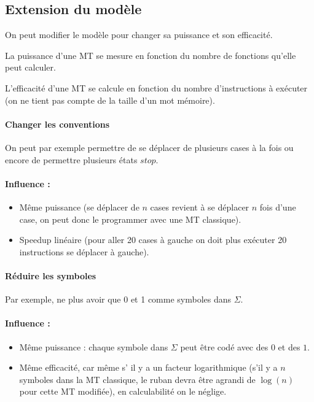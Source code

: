 \subsection{Extension du modèle}
On peut modifier le modèle pour changer sa puissance et son efficacité.

\begin{mydef} La puissance d'une MT se mesure en
	fonction du nombre de fonctions qu'elle peut calculer.
\end{mydef}


\begin{mydef} L'efficacité d'une MT se calcule en
	fonction du nombre d'instructions à exécuter (on ne tient pas compte de
	la taille d'un mot mémoire).
\end{mydef}

\paragraph{Changer les conventions}
On peut par exemple permettre de se déplacer de plusieurs cases à la fois ou
encore de permettre plusieurs états $stop$.

\paragraph{Influence :}
\begin{itemize}
	\item Même puissance (se déplacer de $n$ cases revient à se déplacer $n$ fois d'une case, on peut donc le programmer avec une MT classique).
	\item Speedup linéaire (pour aller 20 cases à gauche on doit plus
		exécuter 20 instructions se déplacer à gauche).
\end{itemize}

\paragraph{Réduire les symboles} Par exemple, ne plus avoir que 0 et 1 comme
symboles dans $\Sigma$.

\paragraph{Influence :}
\begin{itemize}
	\item Même puissance : chaque symbole dans $\Sigma$ peut être codé avec des $0$ et des $1$.
	\item Même efficacité, car même s’ il y a un facteur logarithmique (s'il y a $n$ symboles dans la MT classique, le ruban devra être agrandi de $\log(n)$ pour cette MT modifiée), en calculabilité on le néglige.
\end{itemize}

